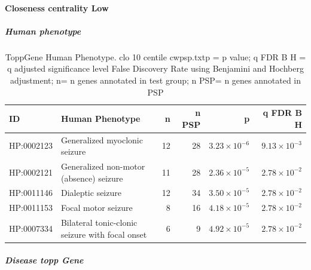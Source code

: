 \paragraph{Closeness centrality Low}
\subparagraph{Human phenotype}
\begin{table}[ht]
\centering
\begin{tabular}{llrrrr}
  \hline
ID & Human Phenotype & n & n PSP & p & q FDR B H \\ 
  \hline
HP:0002123 & Generalized myoclonic seizure & 12 & 28 & $3.23 \times 10^{-6}$ & $9.13 \times 10^{-3}$ \\ 
  HP:0002121 & Generalized non-motor (absence) seizure & 11 & 28 & $2.36 \times 10^{-5}$ & $2.78 \times 10^{-2}$ \\ 
  HP:0011146 & Dialeptic seizure & 12 & 34 & $3.50 \times 10^{-5}$ & $2.78 \times 10^{-2}$ \\ 
  HP:0011153 & Focal motor seizure & 8 & 16 & $4.18 \times 10^{-5}$ & $2.78 \times 10^{-2}$ \\ 
  HP:0007334 & Bilateral tonic-clonic seizure with focal onset & 6 & 9 & $4.92 \times 10^{-5}$ & $2.78 \times 10^{-2}$ \\ 
   \hline
\end{tabular}
\caption{ToppGene Human Phenotype. clo 10 centile cwpsp.txtp = p value; q FDR B H = q adjusted significance level False Discovery Rate using Benjamini and Hochberg adjustment; n= n genes annotated in test group; n PSP= n genes annotated in PSP} 
\label{tab:ToppGENE Human Phenotype. clo 10 centile cwpsp.txtp = p value; q FDR B H = q adjusted significance level False Discovery Rate using Benjamini and Hochberg adjustment; n= n genes annotated in test group; n PSP= n genes annotated in PSP}
\end{table}
\subparagraph{Disease topp Gene}
